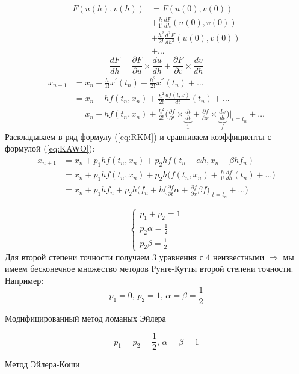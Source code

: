 \documentclass[a4paper,11pt]{article}
\begin{document}
\begin{align*}
  F(u(h), v(h)) &= F(u(0), v(0)) \\
                &+ \frac{h}{1!} \frac{dF}{dh}(u(0), v(0)) \\
                &+ \frac{h^2}{2!} \frac{d^2F}{dh^2}(u(0), v(0)) \\
                &+ \dots
\end{align*}
\[\frac{dF}{dh} = \frac{\partial F}{\partial u} \times \frac{du}{dh} + \frac{\partial F}{\partial v} \times \frac{dv}{dh}\]
\begin{equation}
  \begin{aligned}
    x_{n+1} &= x_n + \frac{h}{1!}x^{'}(t_n) + \frac{h^2}{2!}x^{''}(t_n) + \dots \\
            &= x_n + hf(t_n, x_n) + \frac{h^2}{2!}\frac{df(t, x)}{dt}(t_n) + \dots \\
            &= x_n + hf(t_n, x_n) + \frac{h^2}{2!}\Big (\frac{\partial f}{\partial t} \times \underbrace{\frac{dt}{dt}}_{1} + \frac{\partial f}{\partial x} \times \underbrace{\frac{dx}{dt}}_{f}\Big ) \Big |_{t=t_n} + \dots
  \end{aligned}
  \label{eq:KAWO}
\end{equation}
Раскладываем в ряд формулу (\ref{eq:RKM}) и сравниваем коэффициенты с формулой (\ref{eq:KAWO}):
\begin{align*}
  x_{n+1} &= x_n + p_1hf(t_n, x_n) + p_2hf(t_n + \alpha h, x_n + \beta hf_n) \\
          &= x_n + p_1hf(t_n, x_n) + p_2h\Big(f(t_n, x_n) + \frac{h}{1!}\frac{df}{dh}(t_n) + \dots\Big) \\
          &= x_n + p_1hf_n + p_2h\Big(f_n + h\Big(\frac{\partial f}{\partial t}\alpha + \frac{\partial f}{\partial x}\beta f \Big)\Big |_{t=t_n} + \dots\Big)
\end{align*}
\begin{importantblock}
  \begin{equation*}
    \begin{cases}
      p_1 + p_2 = 1 \\
      p_2\alpha = \frac{1}{2} \\
      p_2\beta = \frac{1}{2}
    \end{cases}
  \end{equation*}
  Для второй степени точности получаем $3$ уравнения с $4$ неизвестными $\Rightarrow$ мы имеем бесконечное множество методов Рунге-Кутты второй степени точности. \\
  Например:
  \[p_1 = 0,\, p_2 = 1,\, \alpha = \beta = \frac{1}{2}\]
  \begin{center}
    \small{Модифицированный метод ломаных Эйлера}
  \end{center}
  \[p_1 = p_2 = \frac{1}{2},\, \alpha = \beta = 1\]
  \begin{center}
    \small{Метод Эйлера-Коши}
  \end{center}
\end{importantblock}
\end{document}
